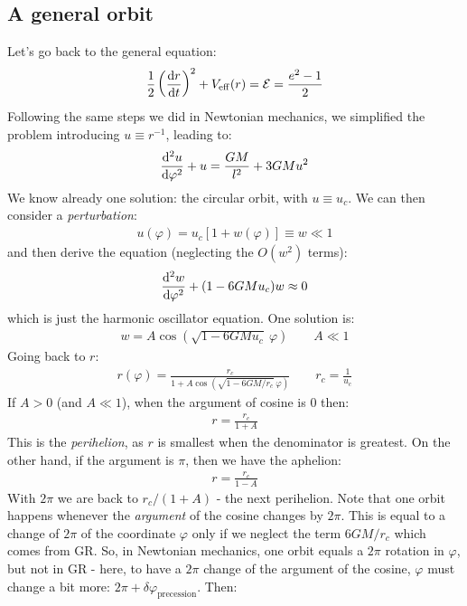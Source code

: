 \documentclass[../template.tex]{subfiles}
\begin{document}
\subsection{A general orbit}
Let's go back to the general equation:
\begin{align*}
    \frac{1}{2}\left(\dv{r}{t}\right)^2 + V_{\mathrm{eff} }(r) = \mathcal{E} = \frac{e^2-1}{2} 
\end{align*}
Following the same steps we did in Newtonian mechanics, we simplified the problem introducing $u \equiv r^{-1}$, leading to:
\begin{align*}
    \dv[2]{u}{\varphi} + u = \frac{GM}{l^2} + 3GM u^2 
\end{align*} 
We know already one solution: the circular orbit, with $u \equiv u_c$. We can then consider a \textit{perturbation}:
\begin{align*}
    u(\varphi) = u_c[1+ w(\varphi)] \equiv w \ll 1
\end{align*}  
and then derive the equation (neglecting the $O(w^2)$ terms):
\begin{align*}
    \dv[2]{w}{\varphi} + (1- 6GM u_c) w \approx 0
\end{align*}
which is just the harmonic oscillator equation. One solution is:
\begin{align*}
    w = A \cos(\sqrt{1- 6GM u_c}\>\varphi) \qquad A \ll 1
\end{align*}
Going back to $r$:
\begin{align*}
    r(\varphi) = \frac{r_c}{1+ A \cos(\sqrt{1- 6GM/r_c}\> \varphi)} \qquad r_c = \frac{1}{u_c}  
\end{align*} 
If $A > 0$ (and $A \ll 1$), when the argument of cosine is $0$ then:
\begin{align*}
    r = \frac{r_c}{1+A} 
\end{align*}  
This is the \textit{perihelion}, as $r$ is smallest when the denominator is greatest. On the other hand, if the argument is $\pi$, then we have the aphelion:
\begin{align*}
    r = \frac{r_c}{1-A} 
\end{align*} 
With $2\pi$ we are back to $r_c/(1+A)$ - the next perihelion. Note that one orbit happens whenever the \textit{argument} of the cosine changes by $2\pi$. This is equal to a change of $2\pi$ of the coordinate $\varphi$ only if we neglect the term $6GM/r_c$ which comes from GR. So, in Newtonian mechanics, one orbit equals a $2\pi$ rotation in $\varphi$, but not in GR - here, to have a $2\pi$ change of the argument of the cosine, $\varphi$ must change a bit more: $2\pi + \delta \varphi_{\mathrm{precession}}$. Then:
\end{document}
